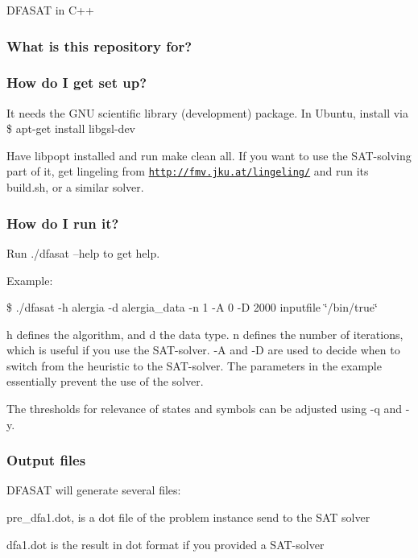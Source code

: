D\+F\+A\+S\+AT in C++

\subsubsection*{What is this repository for?}

\subsubsection*{How do I get set up?}

It needs the G\+NU scientific library (development) package. In Ubuntu, install via \$ apt-\/get install libgsl-\/dev

Have libpopt installed and run make clean all. If you want to use the S\+A\+T-\/solving part of it, get lingeling from \href{http://fmv.jku.at/lingeling/}{\tt http\+://fmv.\+jku.\+at/lingeling/} and run its build.\+sh, or a similar solver.

\subsubsection*{How do I run it?}

Run ./dfasat --help to get help.

Example\+:

\$ ./dfasat -\/h alergia -\/d alergia\+\_\+data -\/n 1 -\/A 0 -\/D 2000 inputfile \char`\"{}/bin/true\char`\"{}

h defines the algorithm, and d the data type. n defines the number of iterations, which is useful if you use the S\+A\+T-\/solver. -\/A and -\/D are used to decide when to switch from the heuristic to the S\+A\+T-\/solver. The parameters in the example essentially prevent the use of the solver.

The thresholds for relevance of states and symbols can be adjusted using -\/q and -\/y.

\subsubsection*{Output files}

D\+F\+A\+S\+AT will generate several files\+:


\begin{DoxyItemize}
\item pre\+\_\+dfa1.\+dot, is a dot file of the problem instance send to the S\+AT solver
\item dfa1.\+dot is the result in dot format if you provided a S\+A\+T-\/solver
\end{DoxyItemize}

